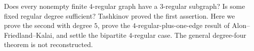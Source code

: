 Does every nonempty finite $4$-regular graph have a $3$-regular subgraph? Is some fixed regular degree sufficient? Tashkinov proved the first assertion. Here we prove the second with degree $5$, prove the $4$-regular-plus-one-edge result of Alon--Friedland--Kalai, and settle the bipartite $4$-regular case. The general degree-four theorem is not reconstructed.
